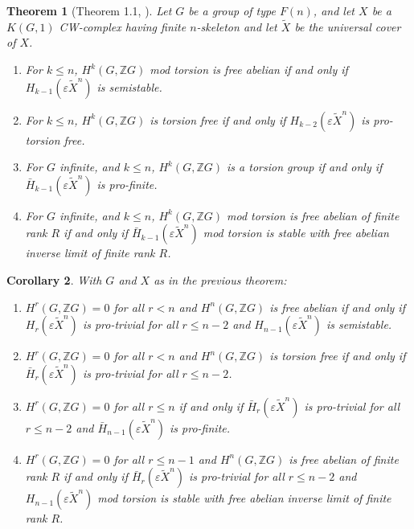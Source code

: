 \documentclass[12pt]{article}
\newtheorem{theorem}{Theorem}[subsection]
\newtheorem{corollary}[theorem]{Corollary}
\begin{document}
\begin{theorem} [Theorem 1.1, \cite{GM85}]\label{GMEnd}   
Let $G$ be a group of type $F(n)$, and let $X$ be a $K(G,1)$ CW-complex having finite $n$-skeleton and let $\tilde X$ be the universal cover of $X$. 
\begin{enumerate}
\item For $k\leq n$, $H^k(G,\mathbb ZG)$ mod torsion is free abelian if and only if $H_{k-1}(\varepsilon\tilde X^n)$ is semistable. 
\item For $k\leq n$, $H^k(G,\mathbb ZG)$ is torsion free if and only if $H_{k-2}(\varepsilon \tilde X^n)$ is pro-torsion free. 
\item For $G$ infinite, and $k\leq n$, $H^k(G,\mathbb ZG)$ is a torsion group if and only if $\bar H_{k-1}(\varepsilon \tilde X^n)$ is pro-finite.
\item For $G$ infinite, and $k\leq n$, $H^k(G, \mathbb ZG)$ mod torsion is free abelian of finite rank $R$ if and only if $\bar H_{k-1}(\varepsilon\tilde X^n)$ mod torsion is stable with free abelian inverse limit of finite rank $R$.
\end{enumerate}
\end{theorem}

\begin{corollary}\label{GME2}  
With $G$ and $X$ as in the previous theorem:
\begin{enumerate}
\item $H^r(G,\mathbb ZG)=0$ for all $r<n$ and $H^n(G,\mathbb ZG)$ is free abelian  if and only if $H_{r}(\varepsilon\tilde X^n)$ is  pro-trivial for all $r\leq n-2$ and $H_{n-1}(\varepsilon\tilde X^n)$ is semistable. 

\item  $H^r(G,\mathbb ZG)=0$ for all $r<n$ and $H^n(G,\mathbb ZG)$  is torsion free if and only if $\bar H_{r}(\varepsilon \tilde X^n)$ is pro-trivial for all $r\leq n-2$. 

\item  $H^r(G,\mathbb ZG)=0$ for all $r\leq n$ if and only if $\bar H_{r}(\varepsilon \tilde X^n)$ is pro-trivial for all $r\leq n-2$ and $\bar H_{n-1}(\varepsilon \tilde X^n)$ is pro-finite.

\item  $H^r(G, \mathbb ZG)=0$ for all $r\leq n-1$ and $H^n(G,\mathbb ZG)$ is free abelian of finite rank $R$ if and only if $\bar H_{r}(\varepsilon\tilde X^n)$ is pro-trivial for all $r\leq n-2$ and $H_{n-1}(\varepsilon \tilde X^n)$ mod torsion is stable with free abelian inverse limit of finite rank $R$.
\end{enumerate}
\end{corollary}
\end{document}
